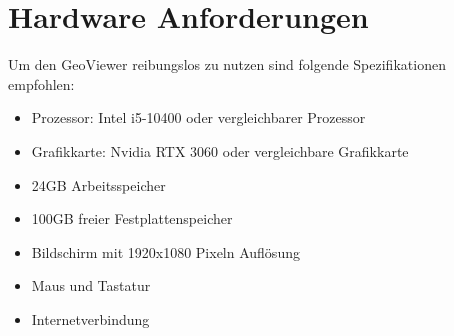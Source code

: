 \chapter{Hardware Anforderungen}

Um den GeoViewer reibungslos zu nutzen sind folgende Spezifikationen empfohlen:

\begin{itemize}
    \item Prozessor: Intel i5-10400 oder vergleichbarer Prozessor
    \item Grafikkarte: Nvidia RTX 3060 oder vergleichbare Grafikkarte
    \item 24GB Arbeitsspeicher
    \item 100GB freier Festplattenspeicher
    \item Bildschirm mit 1920x1080 Pixeln Auflösung
    \item Maus und Tastatur
    \item Internetverbindung
\end{itemize}
